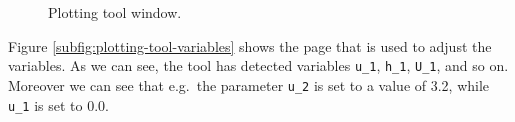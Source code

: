 \documentclass[a4paper, twoside]{article}
\begin{document}
\begin{figure}[ht]
  \centering
   \hspace{.3cm}
  \caption{Plotting tool window.}
  \label{fig:plotting-tool}
\end{figure}

Figure \ref{subfig:plotting-tool-variables} shows the page that is used to adjust the variables. As we can see, the tool has detected variables \texttt{u\_1}, \texttt{h\_1}, \texttt{U\_1}, and so on. Moreover we can see that e.g.\, the parameter \texttt{u\_2} is set to a value of 3.2, while \texttt{u\_1} is set to 0.0.
\end{document}
